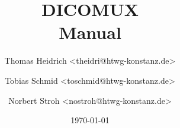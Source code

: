 %
%

\begin{titlepage}
\title{DICOMUX \\ Manual}
\author {
Thomas Heidrich <theidri@htwg-konstanz.de> \and
Tobias Schmid <toschmid@htwg-konstanz.de> \and
Norbert Stroh <nostroh@htwg-konstanz.de>
}
\date{\today}
\maketitle

\end{titlepage}

%
%